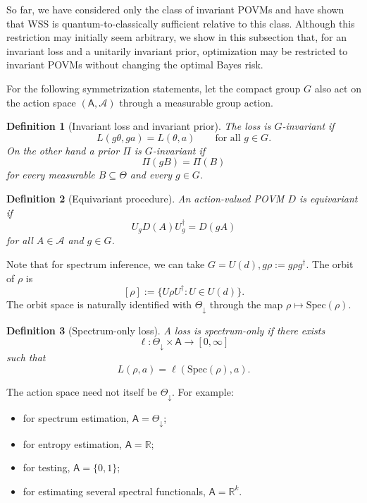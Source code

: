 \documentclass{article}
\newtheorem{definition}{Definition}
\theoremstyle{named}
\theoremstyle{named1}
\newcommand{\R}{\mathbb{R}}
\newcommand{\cA}{\mathcal A}
\theoremstyle{plain}
\theoremstyle{remark}
\begin{document}
So far, we have considered only the class of invariant POVMs and have shown that WSS is quantum-to-classically sufficient relative to this class. Although this restriction may initially seem arbitrary, we show in this subsection that, for an invariant loss and a unitarily invariant prior, optimization may be restricted to invariant POVMs without changing the optimal Bayes risk.

For the following symmetrization statements, let the compact group
\(G\) also act on the action space \((\mathsf A,\mathcal A)\) through
a measurable group action.

\begin{definition}[Invariant loss and invariant prior]
The loss is $G$-invariant if
\[
    L(g\theta,ga)=L(\theta,a)
    \qquad\text{for all }g\in G.
\]
On the other hand a prior $\Pi$ is $G$-invariant if
\[
    \Pi(gB)=\Pi(B)
\]
for every measurable $B\subseteq\Theta$ and every $g\in G$.
\end{definition}

\begin{definition}[Equivariant procedure]
An action-valued POVM $D$ is equivariant if
\[
    U_gD(A)U_g^{\dagger}=D(gA)
\]
for all $A\in\cA$ and $g\in G$.
\end{definition}

Note that for spectrum inference, we can take
$G=U(d),
    g\rho:=g\rho g^{\dagger}.$
The orbit of $\rho$ is
\[
    [\rho]:=\{U\rho U^{\dagger}:U\in U(d)\}.
\]
The orbit space is naturally identified with $\Theta_{\downarrow}$ through the map
$\rho\mapsto\mathrm{Spec}(\rho)$.

\begin{definition}[Spectrum-only loss]
A loss is spectrum-only if there exists
\[
    \ell:\Theta_{\downarrow}\times\mathsf A\to[0,\infty]
\]
such that
\[
    L(\rho,a)=\ell(\mathrm{Spec}(\rho),a).
\]
\end{definition}

The action space need not itself be $\Theta_{\downarrow}$.  For example:
\begin{itemize}
    \item for spectrum estimation, $\mathsf A=\Theta_{\downarrow}$;
    \item for entropy estimation, $\mathsf A=\R$;
    \item for testing, $\mathsf A=\{0,1\}$;
    \item for estimating several spectral functionals, $\mathsf A=\R^k$.
\end{itemize}
\end{document}
